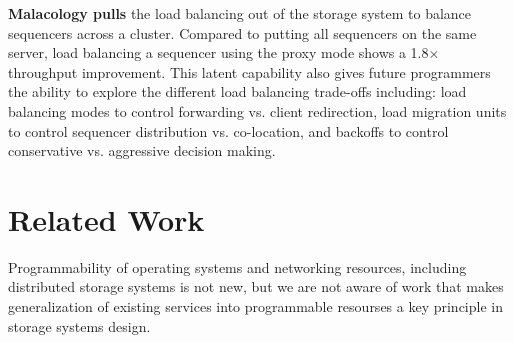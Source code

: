 \documentclass[preprint]{sigplanconf-eurosys}
\begin{document}
\noindent\textbf{Malacology pulls} the load balancing out of the storage system
to balance sequencers across a cluster. Compared to putting all sequencers on
the same server, load balancing a sequencer using the proxy mode shows a
1.8\(\times\) throughput improvement. This latent capability also gives future
programmers the ability to explore the different load balancing trade-offs
including: load balancing modes to control forwarding vs. client redirection,
load migration units to control sequencer distribution vs. co-location, and
backoffs to control conservative vs. aggressive decision making.


%
%
%

\section{Related Work}


Programmability of operating systems and networking resources, including
distributed storage systems is not new, but we are not aware of work that makes
generalization of existing services into programmable resourses a key principle
in storage systems design. 
\end{document}
